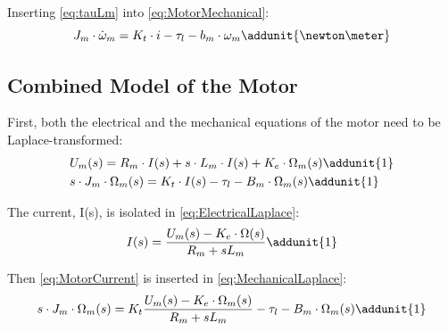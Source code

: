 \startexplain
\stopexplain

Inserting \autoref{eq:tauLm} into \autoref{eq:MotorMechanical}:
\begin{equation}
	J_{m} \cdot \dot{\omega}_{m} = K_{t} \cdot i - \tau_{l} - b_{m} \cdot \omega_{m} \addunit{\newton\meter}
\end{equation}

\subsection*{Combined Model of the Motor}
First, both the electrical and the mechanical equations of the motor need to be Laplace-transformed:
\begin{subequations}
	\begin{flalign}
		&U_{m}(s) = R_{m} \cdot I(s) + s \cdot L_{m} \cdot I(s) + K_{e} \cdot \Omega_{m}(s) \addunit{1} \label{eq:ElectricalLaplace}\\	
		&s\cdot J_{m} \cdot \Omega_{m}(s) = K_{t} \cdot I(s) - \tau_{l} - B_{m} \cdot \Omega_{m}(s) \addunit{1}	\label{eq:MechanicalLaplace}
	\end{flalign}
\end{subequations}

The current, I(s), is isolated in \autoref{eq:ElectricalLaplace}:
\begin{equation}
	I(s)=\frac{U_m(s)-K_e\cdot\Omega(s)}{R_m+sL_m} \addunit{1}
	\label{eq:MotorCurrent}
\end{equation}

Then \autoref{eq:MotorCurrent} is inserted in \autoref{eq:MechanicalLaplace}:
\begin{equation}
	s\cdot J_{m} \cdot \Omega_{m}(s) = K_{t} \frac{U_m(s)-K_e\cdot\Omega_{m}(s)}{R_m+sL_m} - \tau_{l} - B_{m} \cdot \Omega_{m}(s) \addunit{1}
	\label{eq:Iinserted}	
\end{equation}







